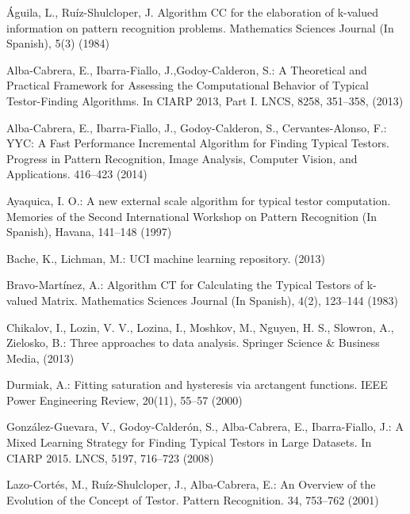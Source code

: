 \documentclass[citeauthoryear]{llncs}
\begin{document}
%
\begin{thebibliography}{}
%

	Águila, L., Ruíz-Shulcloper, J.  
	Algorithm CC for the elaboration of k-valued information on pattern recognition problems. 
	Mathematics Sciences Journal (In Spanish), 
	5(3) (1984)
	
	Alba-Cabrera, E., Ibarra-Fiallo, J.,Godoy-Calderon, S.:
	A Theoretical and Practical Framework for Assessing the Computational Behavior of Typical Testor-Finding Algorithms.
	In CIARP 2013, Part I. LNCS,
	8258, 351--358, (2013)
	
	Alba-Cabrera, E., Ibarra-Fiallo, J., Godoy-Calderon, S., Cervantes-Alonso, F.:
	YYC: A Fast Performance Incremental Algorithm for Finding Typical Testors.
	Progress in Pattern Recognition, Image Analysis, Computer Vision, and Applications.
	416--423 (2014)
	
	Ayaquica, I. O.:
	A new external scale algorithm for typical testor computation.
	Memories of the Second International Workshop on Pattern Recognition (In Spanish), 
	Havana, 141--148 (1997)
	
	Bache, K., Lichman, M.:
	UCI machine learning repository.
	(2013)
	
	Bravo-Martínez, A.:
	Algorithm CT for Calculating the Typical Testors of k-valued Matrix. 
	Mathematics Sciences Journal (In Spanish), 
	4(2), 123--144 (1983)
	
	Chikalov, I., Lozin, V. V., Lozina, I., Moshkov, M., Nguyen, H. S., Slowron, A., Zielosko, B.:
 	Three approaches to data analysis. 
 	Springer Science \& Business Media, 
 	(2013)
	
	Durmiak, A.:
	Fitting saturation and hysteresis via arctangent functions. 
	IEEE Power Engineering Review,
	20(11), 55--57 (2000)

	González-Guevara, V., Godoy-Calderón, S., Alba-Cabrera, E.,  Ibarra-Fiallo, J.:
	A Mixed Learning Strategy for Finding Typical Testors in Large Datasets. 
	In CIARP 2015. LNCS,
	5197, 716--723 (2008)
		
	Lazo-Cort\'es, M., Ruíz-Shulcloper, J., Alba-Cabrera, E.:
	An Overview of the Evolution of the Concept of Testor. 
	Pattern Recognition. 34, 753--762 (2001)


\end{thebibliography}
\end{document}
